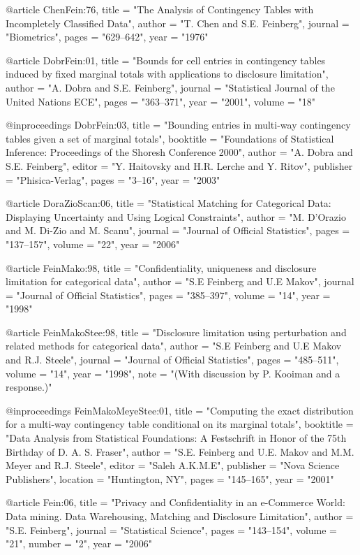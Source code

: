 @article{ ChenFein:76,
	title = "The Analysis of Contingency Tables with Incompletely Classified Data",
	author = "T. Chen and S.E. Feinberg",
	journal = "Biometrics",
	pages = "629--642",
	year = "1976"
}

@article{ DobrFein:01,
	title = "Bounds for cell entries in contingency tables induced by fixed marginal totals with applications to disclosure limitation",
	author = "A. Dobra and S.E. Feinberg",
	journal = "Statistical Journal of the United Nations ECE",
	pages = "363--371",
	year = "2001",
	volume = "18"
}

@inproceedings{ DobrFein:03,
	title = "Bounding entries in multi-way contingency tables given a set of marginal totals",
	booktitle = "Foundations of Statistical Inference: Proceedings of the Shoresh Conference 2000",
	author = "A. Dobra and S.E. Feinberg",
	editor = "Y. Haitovsky and H.R. Lerche and Y. Ritov",
	publisher = "Phisica-Verlag",
	pages = "3--16",
	year = "2003"
}

@article{ DoraZioScan:06,
	title = "Statistical Matching for Categorical Data: Displaying Uncertainty and Using Logical Constraints",
	author = "M. D'Orazio and M. Di-Zio and M. Scanu",
	journal = "Journal of Official Statistics",
	pages = "137--157",
	volume = "22",
	year = "2006"
}

@article{ FeinMako:98,
	title = "Confidentiality, uniqueness and disclosure limitation for categorical data",
	author = "S.E Feinberg and U.E Makov",
	journal = "Journal of Official Statistics",
	pages = "385--397",
	volume = "14",
	year = "1998"
}

@article{ FeinMakoStee:98,
	title = "Disclosure limitation using perturbation and related methods for categorical data",
	author = "S.E Feinberg and U.E Makov and R.J. Steele",
	journal = "Journal of Official Statistics",
	pages = "485--511",
	volume = "14",
	year = "1998",
	note = "(With discussion by P. Kooiman and a response.)"
}

@inproceedings{ FeinMakoMeyeStee:01,
	title = "Computing the exact distribution for a multi-way contingency table conditional on its marginal totals",
	booktitle = "Data Analysis from Statistical Foundations: A Festschrift in Honor of the 75th Birthday of D. A. S. Fraser",
	author = "S.E. Feinberg and U.E. Makov and M.M. Meyer and R.J. Steele",
	editor = "Saleh A.K.M.E",
	publisher = "Nova Science Publishers",
	location = "Huntington, NY",
	pages = "145--165",
	year = "2001"
}

@article{ Fein:06,
	title = "Privacy and Confidentiality in an e-Commerce World: Data mining. Data Warehousing, Matching and Disclosure Limitation",
	author = "S.E. Feinberg",
	journal = "Statistical Science",
	pages = "143--154",
	volume = "21",
	number = "2",
	year = "2006"
}

